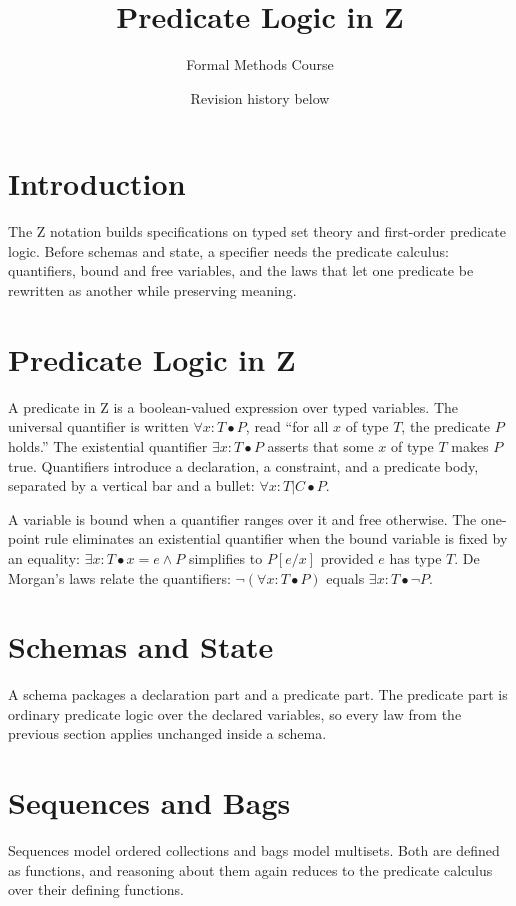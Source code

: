 \documentclass{article}
\title{Predicate Logic in Z}
\author{Formal Methods Course}
\date{Revision history below}
\begin{document}
\maketitle

\section{Introduction}
The Z notation builds specifications on typed set theory and first-order
predicate logic. Before schemas and state, a specifier needs the predicate
calculus: quantifiers, bound and free variables, and the laws that let one
predicate be rewritten as another while preserving meaning.

\section{Predicate Logic in Z}
A predicate in Z is a boolean-valued expression over typed variables. The
universal quantifier is written $\forall x : T \bullet P$, read ``for all
$x$ of type $T$, the predicate $P$ holds.'' The existential quantifier
$\exists x : T \bullet P$ asserts that some $x$ of type $T$ makes $P$ true.
Quantifiers introduce a declaration, a constraint, and a predicate body,
separated by a vertical bar and a bullet: $\forall x : T | C \bullet P$.

A variable is bound when a quantifier ranges over it and free otherwise.
The one-point rule eliminates an existential quantifier when the bound
variable is fixed by an equality: $\exists x : T \bullet x = e \land P$
simplifies to $P[e/x]$ provided $e$ has type $T$. De Morgan's laws relate
the quantifiers: $\lnot (\forall x : T \bullet P)$ equals
$\exists x : T \bullet \lnot P$.

\section{Schemas and State}
A schema packages a declaration part and a predicate part. The predicate
part is ordinary predicate logic over the declared variables, so every
law from the previous section applies unchanged inside a schema.

\section{Sequences and Bags}
Sequences model ordered collections and bags model multisets. Both are
defined as functions, and reasoning about them again reduces to the
predicate calculus over their defining functions.
\end{document}
